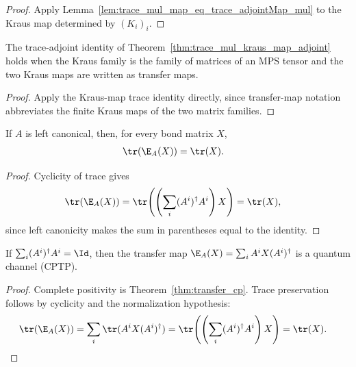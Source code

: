 \begin{proof}\leanok
    Apply Lemma~\ref{lem:trace_mul_map_eq_trace_adjointMap_mul} to the Kraus
    map determined by $(K_i)_i$.
\end{proof}

\begin{lemma}
    \label{lem:trace_mul_transfer_map_adjoint}
    \leanok
    The trace-adjoint identity of
    Theorem~\ref{thm:trace_mul_kraus_map_adjoint}
    holds when the Kraus family is the family of matrices of an MPS tensor and
    the two Kraus maps are written as transfer maps.
\end{lemma}

\begin{proof}\leanok
    Apply the Kraus-map trace identity directly, since transfer-map notation
    abbreviates the finite Kraus maps of the two matrix families.
\end{proof}

\begin{lemma}
    \label{lem:trace_transfer_map_left_canonical}
    \leanok
    If $A$ is left canonical, then, for every bond matrix $X$,
    \begin{align}
        \tr(\E_A(X))&=\tr(X).
        \notag
    \end{align}
\end{lemma}

\begin{proof}\leanok
    Cyclicity of trace gives
    \begin{align}
        \tr(\E_A(X))
        &=\tr\!\left(\left(\sum_i(A^i)^\dagger A^i\right)X\right)
         =\tr(X),
        \notag
    \end{align}
    since left canonicity makes the sum in parentheses equal to the identity.
\end{proof}

\begin{theorem}\label{thm:transfer_channel}
    \leanok
    If $\sum_i(A^i)^\dagger A^i=\Id$, then the transfer map
    $\E_A(X)=\sum_i A^iX(A^i)^\dagger$ is a quantum channel (CPTP).
\end{theorem}

\begin{proof}\leanok{}
    Complete positivity is Theorem~\ref{thm:transfer_cp}. Trace preservation
    follows by cyclicity and the normalization hypothesis:
    \begin{align}
        \tr(\E_A(X))
         & =\sum_i\tr(A^iX(A^i)^\dagger)
        =\tr\!\left(\left(\sum_i(A^i)^\dagger A^i\right)X\right)
        =\tr(X).
        \notag
    \end{align}
\end{proof}
